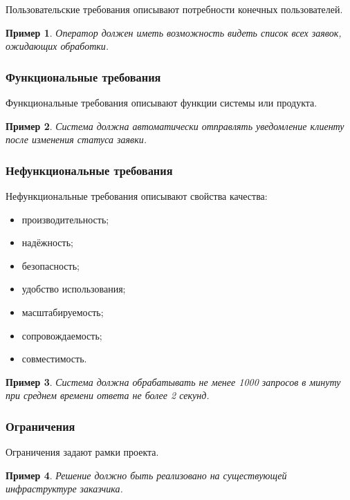 \documentclass[12pt,a4paper]{article}
\newtheorem{example}{Пример}
\begin{document}
Пользовательские требования описывают потребности конечных пользователей.

\begin{example}
Оператор должен иметь возможность видеть список всех заявок, ожидающих обработки.
\end{example}

\subsubsection{Функциональные требования}

Функциональные требования описывают функции системы или продукта.

\begin{example}
Система должна автоматически отправлять уведомление клиенту после изменения статуса заявки.
\end{example}

\subsubsection{Нефункциональные требования}

Нефункциональные требования описывают свойства качества:
\begin{itemize}
    \item производительность;
    \item надёжность;
    \item безопасность;
    \item удобство использования;
    \item масштабируемость;
    \item сопровождаемость;
    \item совместимость.
\end{itemize}

\begin{example}
Система должна обрабатывать не менее 1000 запросов в минуту при среднем времени ответа не более 2 секунд.
\end{example}

\subsubsection{Ограничения}

Ограничения задают рамки проекта.

\begin{example}
Решение должно быть реализовано на существующей инфраструктуре заказчика.
\end{example}
\end{document}

